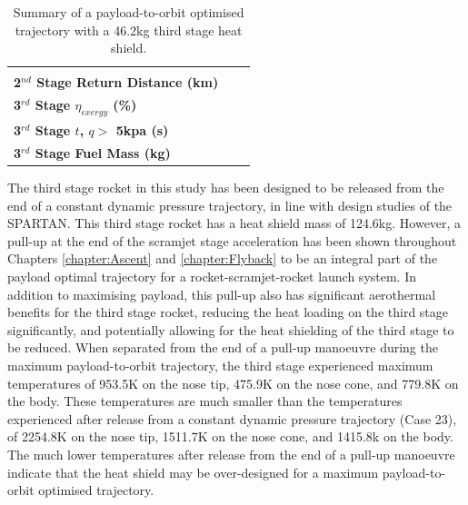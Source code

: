 \begin{table}[!ht]
\begin{tabular}{l c c}
		& \returnFuelStandard
		\\
		\textbf{2$^{nd}$ Stage Return Distance (km)}
		& \returnDistTPSreduced
		& \returnDistStandard
		\\
		\hline 
		\textbf{3$^{rd}$ Stage $\eta_{exergy}$ (\%)}
		& \textbf{\thirddExergyEffTPSreduced}
		& \textbf{\thirddExergyEffStandard}
		\\
		\textbf{3$^{rd}$ Stage $t$, $q >$ 5kpa (s)}
		& \thirdqOverFiveTPSreduced
		& \thirdqOverFiveStandard
		\\
		\textbf{3$^{rd}$ Stage Fuel Mass (kg)}
		& \thirdmFuelTPSreduced
		& \thirdmFuelStandard
		\\
		\hline 
	\end{tabular} 
	
	\caption{Summary of a payload-to-orbit optimised trajectory with a 46.2kg third stage heat shield.}
	\label{tab:heatshieldreduced}
	
\end{table}
\noindent
The third stage rocket in this study has been designed to be released from the end of a constant dynamic pressure trajectory, in line with design studies of the SPARTAN\cite{Preller2018a}. This third stage rocket has a heat shield mass of 124.6kg. However, a pull-up at the end of the scramjet stage acceleration has been shown throughout Chapters \ref{chapter:Ascent} and \ref{chapter:Flyback} to be an integral part of the payload optimal trajectory for a rocket-scramjet-rocket launch system. In addition to maximising payload, this pull-up also has significant aerothermal benefits for the third stage rocket, reducing the heat loading on the third stage significantly, and potentially allowing for the heat shielding of the third stage to be reduced. When separated from the end of a pull-up manoeuvre during the maximum payload-to-orbit trajectory, the third stage experienced maximum temperatures of 953.5K on the nose tip, 475.9K on the nose cone, and 779.8K on the body. These temperatures are much smaller than the temperatures experienced after release from a constant dynamic pressure trajectory (Case 23), of 2254.8K on the nose tip, 1511.7K on the nose cone, and 1415.8k on the body. The much lower temperatures after release from the end of a pull-up manoeuvre indicate that the heat shield may be over-designed for a maximum payload-to-orbit optimised trajectory.


